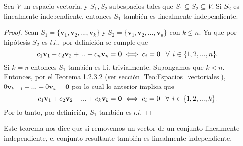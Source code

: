 \documentclass[12pt]{article}
\newenvironment{teorema}[2][Teorema]{\begin{trivlist}
\item[\hskip \labelsep {\bfseries #1}\hskip \labelsep {\bfseries #2.}]}{\end{trivlist}}
\begin{document}
\begin{teorema} {3.3.3.2} 

    Sea $V$ un espacio vectorial y $S_1,S_2$ subespacios tales que $S_1\subseteq S_2\subseteq V$. Si $S_2$ es linealmente independiente, entonces $S_1$ también es linealmente independiente.

\begin{proof}

    Sean $S_1=\{\mathbf{v}_1,\mathbf{v}_2, ..., \mathbf{v}_k\}$ y $S_2=\{\mathbf{v}_1,\mathbf{v}_2, ..., \mathbf{v}_n\}$ con $k\leq n$. Ya que por hipótesis $S_2$ es $l.i.$, por definición se cumple que $$c_1\mathbf{v}_1+c_2\mathbf{v}_2+...+c_n\mathbf{v}_n=\mathbf{0}\iff c_i=0\hspace{3mm}\forall\hspace{1.5mm}  i\in\{1,2, ..., n\}.$$ Si $k=n$ entonces $S_1$ también es l.i. trivialmente. Supongamos que $k<n$. Entonces, por el Teorema 1.2.3.2 (ver sección \ref{Teo:Espacios_vectoriales}), $0\mathbf{v}_{k+1}+...+0\mathbf{v}_n=\mathbf{0}$ por lo cual lo anterior implica que $$c_1\mathbf{v}_1+c_2\mathbf{v}_2+...+c_k\mathbf{v}_k=\mathbf{0}\iff c_i=0\hspace{3mm}\forall\hspace{1.5mm}  i\in\{1,2, ...,k\}.$$ Por lo tanto, por definición, $S_1$ también es $l.i$.

\end{proof}

Este teorema nos dice que si removemos un vector de un conjunto linealmente independiente, el conjunto resultante también es linealmente independiente.

\end{teorema}
\end{document}
